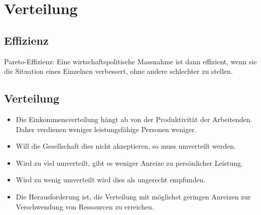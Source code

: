 \section{Verteilung}
\subsection{Effizienz}
Pareto-Effizienz: Eine wirtschaftspolitische Massnahme ist dann effizient, wenn sie die Situation eines Einzelnen verbessert, ohne andere schlechter zu stellen. 
\subsection{Verteilung}
\begin{itemize}
	\item Die Einkommensverteilung hängt ab von der Produktivität der Arbeitenden.
	\subitem Daher verdienen weniger leistungsfähige Personen weniger.
	\item Will die Gesellschaft dies nicht akzeptieren, so muss umverteilt werden.
	\item Wird zu viel umverteilt, gibt es weniger Anreize zu persönlicher Leistung.
	\item Wird zu wenig umverteilt wird dies als ungerecht empfunden.
	\item Die Herausforderung ist, die Verteilung mit möglichst geringen Anreizen zur Verschwendung von Ressourcen zu erreichen.
\end{itemize}

